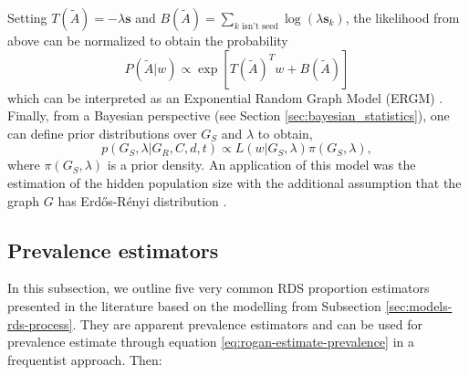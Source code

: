 Setting $T(\tilde{A}) = -\lambda \boldsymbol{s}$ and $B(\tilde{A}) = \sum_{k \text{ isn't seed}}
\log(\lambda \boldsymbol{s}_k)$, the likelihood from above can be normalized to obtain
the probability 
\begin{equation*}
  P(\tilde{A}|w) \propto \exp\left[T(\tilde{A})^Tw + B(\tilde{A})\right]
\end{equation*}
which can be interpreted as an Exponential Random Graph Model (ERGM) \cite[p.
198]{crawford2016}. Finally, from a Bayesian perspective (see Section
\ref{sec:bayesian_statistics}), one can define prior distributions over $G_S$
and $\lambda$ to obtain, 
\begin{equation}
  \label{eq:posterior-distribution-graph}
  p(G_S, \lambda | G_R,C,d,t) \propto L(w|G_S, \lambda) \pi(G_S, \lambda), 
\end{equation}
where $\pi(G_S, \lambda)$ is a prior density. An application of this model was
the estimation of the hidden population size with the additional assumption
that the graph $G$ has Erdős-Rényi distribution 
\cite{crawford2018hidden}. 

\subsection{Prevalence estimators}

In this subsection, we outline five very common RDS proportion estimators presented in the
literature based on the modelling from Subsection
\ref{sec:models-rds-process}. They are apparent prevalence estimators and can
be used for prevalence estimate through equation
\eqref{eq:rogan-estimate-prevalence} in a frequentist approach. Then:

